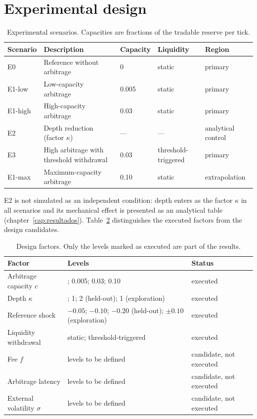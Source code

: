 \section{Experimental design}

\begin{table}[htbp]
\centering
\caption{Experimental scenarios. Capacities are fractions of the tradable reserve per tick.}
\label{tab:escenarios}
\small
\begin{tabularx}{\textwidth}{@{}l >{\raggedright\arraybackslash}X l l l@{}}
\toprule
Scenario & Description & Capacity & Liquidity & Region \\
\midrule
E0 & Reference without arbitrage & 0 & static & primary \\
E1-low & Low-capacity arbitrage & 0.005 & static & primary \\
E1-high & High-capacity arbitrage & 0.03 & static & primary \\
E2 & Depth reduction (factor $\kappa$) & --- & --- & analytical control \\
E3 & High arbitrage with threshold withdrawal & 0.03 & threshold-triggered & primary \\
E1-max & Maximum-capacity arbitrage & 0.10 & static & extrapolation \\
\bottomrule
\end{tabularx}
\end{table}

E2 is not simulated as an independent condition: depth enters as the factor $\kappa$ in all scenarios and its mechanical effect is presented as an analytical table (chapter~\ref{cap:resultados}). Table~\ref{tab:factores} distinguishes the executed factors from the design candidates.

\begin{table}[htbp]
\centering
\caption{Design factors. Only the levels marked as executed are part of the results.}
\label{tab:factores}
\scriptsize
\setlength{\tabcolsep}{3pt}
\renewcommand{\arraystretch}{0.9}
\begin{tabularx}{\textwidth}{@{}>{\raggedright\arraybackslash}p{} >{\raggedright\arraybackslash}X >{\raggedright\arraybackslash}p{}@{}}
\toprule
Factor & Levels & Status \\
\midrule
Arbitrage capacity $c$ & 0; 0.005; 0.03; 0.10 & executed \\
Depth $\kappa$ & 0.5; 1; 2 (held-out); 1 (exploration) & executed \\
Reference shock & $-0.05$; $-0.10$; $-0.20$ (held-out); $\pm0.10$ (exploration) & executed \\
Liquidity withdrawal & static; threshold-triggered & executed \\
Fee $f$ & levels to be defined & candidate, not executed \\
Arbitrage latency & levels to be defined & candidate, not executed \\
External volatility $\sigma$ & levels to be defined & candidate, not executed \\
\bottomrule
\end{tabularx}
\end{table}

